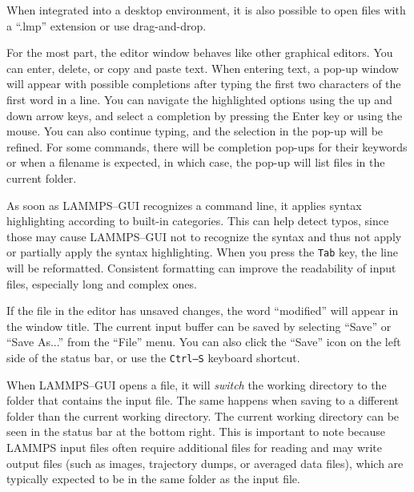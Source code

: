 \documentclass[9pt,tutorial]{livecoms}
\begin{document}
\begin{appendices}
When integrated into a desktop environment, it is also possible to open
files with a ``.lmp'' extension or use drag-and-drop.

For the most part, the editor window behaves like other graphical
editors.  You can enter, delete, or copy and paste text.   When entering
text, a pop-up window will appear with possible completions after typing
the first two characters of the first word in a line.  You can
navigate the highlighted options using the up and down arrow keys, and select a
completion by pressing the Enter key or using the mouse.  You can also continue
typing, and the selection in the pop-up will be refined.  For some
commands, there will be completion pop-ups for their
keywords or when a filename is expected, in which case,
the pop-up will list files in the current folder.

As soon as LAMMPS--GUI recognizes a command line, it applies syntax
highlighting according to built-in categories.  This can help
detect typos, since those may cause LAMMPS--GUI not to
recognize the syntax and thus not apply or partially apply
the syntax highlighting.  When you press the \texttt{Tab} key, the line will be
reformatted.  Consistent formatting can improve the readability of
input files, especially long and complex ones.

If the file in the editor has unsaved changes, the word
``\*modified\*'' will appear in the window title.  The current input
buffer can be saved by selecting ``Save'' or ``Save As...'' from the
``File'' menu.  You can also click the ``Save'' icon on the left side
of the status bar, or use the \texttt{Ctrl--S} keyboard shortcut.

\begin{note}
When LAMMPS--GUI opens a file, it will \emph{switch} the working directory
to the folder that contains the input file.  The same happens when saving to
a different folder than the current working directory.  The current working
directory can be seen in the status bar at the bottom right.  This is important
to note because LAMMPS input files often require additional files for reading and may
write output files (such as images, trajectory dumps, or averaged data files),
which are typically expected to be in the same folder as the input file.
\end{note}



\end{appendices}
\end{document}
